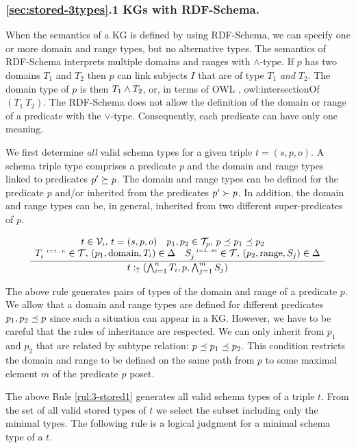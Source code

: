 \documentclass[runningheads]{llncs}
\newcommand{\s}{\scriptscriptstyle\ \,}
\newcommand{\uarr}{\uparrow}
\newcommand{\V}{{\cal V}}
\newcommand{\T}{{\cal T}}
\begin{document}
\subsubsection{\ref{sec:stored-3types}.1 KGs with RDF-Schema.}
When the semantics of a KG is defined by using RDF-Schema, we can
specify one or more domain and range types, but no alternative
types. The semantics of RDF-Schema \cite{rdfsemantics} interprets
multiple domains and ranges with $\land$-type. If $p$ has two domains
$T_1$ and $T_2$ then $p$ can link subjects $I$ that are of type $T_1$
\emph{and} $T_2$. The domain type of $p$ is then $T_1\land\/T_2$, or,
in terms of OWL \cite{owl}, owl:intersectionOf$(T_1\ T_2)$. The
RDF-Schema does not allow the definition of the domain or range of a
predicate with the $\lor$-type. Consequently, each predicate can have
only one meaning.

We first determine \emph{all} valid schema types for a given triple
$t=(s,p,o)$. A schema triple type comprises a predicate $p$ and the
domain and range types linked to predicates $p'\succeq\/p$. The domain
and range types can be defined for the predicate $p$ and/or inherited
from the predicates $p'\succ\/p$. In addition, the domain and range
types can be, in general, inherited from two different
super-predicates of $p$.

\begin{equation}
\label{rul:3-stored1}
\dfrac{\begin{array}{c}
       t\in\V_i,\, t=(s,p,o)\quad p_1,p_2\in\T_p,\, p\preceq\/p_1\preceq\/p_2\quad \\
       T_i^{\s\/i=1..n}\in\T,\, (p_1,\text{domain},T_i)\in\/\Delta\quad S_j^{\s\/j=1..m}\in\T,\, (p_2,\text{range},S_j)\in\Delta
       \end{array}}
      {t:_\uarr\/(\bigwedge_{i=1}^n\/T_i, p, \bigwedge_{j=1}^m\/S_j)}
\end{equation}

The above rule generates pairs of types of the domain and range of a
predicate $p$. We allow that a domain and range types are defined for
different predicates $p_1,p_2\preceq\/p$ since such a situation can
appear in a KG. However, we have to be careful that the rules of
inheritance are respected. We can only inherit from $p_1$ and $p_2$
that are related by subtype relation:
$p\preceq\/p_1\preceq\/p_2$. This condition restricts the domain and
range to be defined on the same path from $p$ to some maximal element
$m$ of the predicate $p$ poset. 


The above Rule \ref{rul:3-stored1} generates all valid schema types of
a triple $t$. From the set of all valid stored types of $t$ we select
the subset including only the minimal types. The following rule is a
logical judgment for a minimal schema type of a $t$. 
\end{document}
